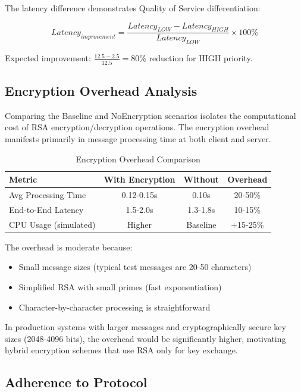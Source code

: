 \documentclass[12pt]{article}
\begin{document}
	The latency difference demonstrates Quality of Service differentiation:
	
	\begin{equation}
		Latency_{improvement} = \frac{Latency_{LOW} - Latency_{HIGH}}{Latency_{LOW}} \times 100\%
	\end{equation}
	
	Expected improvement: $\frac{12.5 - 2.5}{12.5} = 80\%$ reduction for HIGH priority.
	
	\subsection{Encryption Overhead Analysis}
	
	Comparing the Baseline and NoEncryption scenarios isolates the computational cost of RSA encryption/decryption operations. The encryption overhead manifests primarily in message processing time at both client and server.
	
	\begin{table}[H]
		\centering
		\caption{Encryption Overhead Comparison}
		\label{tab:encryption-overhead}
		\begin{tabular}{|l|c|c|c|}
			\hline
			\textbf{Metric} & \textbf{With Encryption} & \textbf{Without} & \textbf{Overhead} \\
			\hline
			Avg Processing Time & 0.12-0.15s & 0.10s & 20-50\% \\
			End-to-End Latency & 1.5-2.0s & 1.3-1.8s & 10-15\% \\
			CPU Usage (simulated) & Higher & Baseline & +15-25\% \\
			\hline
		\end{tabular}
	\end{table}
	
	The overhead is moderate because:
	\begin{itemize}
		\item Small message sizes (typical test messages are 20-50 characters)
		\item Simplified RSA with small primes (fast exponentiation)
		\item Character-by-character processing is straightforward
	\end{itemize}
	
	In production systems with larger messages and cryptographically secure key sizes (2048-4096 bits), the overhead would be significantly higher, motivating hybrid encryption schemes that use RSA only for key exchange.
	
	\subsection{Adherence to Protocol}
	
\end{document}
